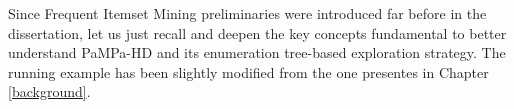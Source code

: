 %
%
%
Since Frequent Itemset Mining preliminaries were introduced far before in the dissertation,
let us just recall and deepen the key concepts fundamental to better understand PaMPa-HD and its
enumeration tree-based exploration strategy. The running example has been slightly modified from the one presentes in Chapter \ref{background}.

